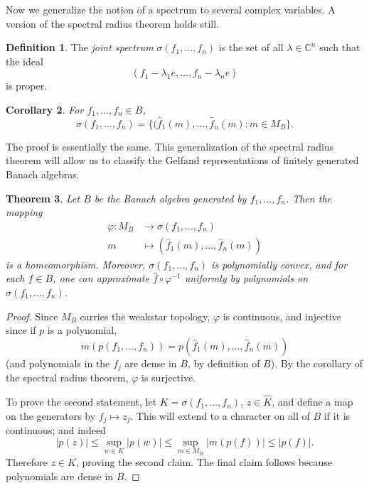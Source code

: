 \documentclass[12pt]{report}
\newcommand{\CC}{\mathbb{C}}
\newcommand{\dfn}[1]{\emph{#1}\index{#1}}
\newtheorem{theorem}{Theorem}[chapter]
\newtheorem{corollary}[theorem]{Corollary}
\theoremstyle{definition}
\newtheorem{definition}[theorem]{Definition}
\begin{document}
    Now we generalize the notion of a spectrum to several complex variables. A version of the spectral radius theorem holds still.
\begin{definition}
    The \dfn{joint spectrum} $\sigma(f_1, \dots, f_n)$ is the set of all $\lambda \in \CC^n$ such that the ideal
    $$(f_1 - \lambda_1 e, \dots, f_n -\lambda_n e)$$
    is proper.
\end{definition}
\begin{corollary}
    For $f_1, \dots, f_n \in B$,
    $$\sigma(f_1, \dots, f_n) = \{(\hat f_1(m), \dots, \hat f_n(m): m \in M_B\}.$$
\end{corollary}
    The proof is essentially the same. This generalization of the spectral radius theorem will allow us to classify the Gelfand representations of finitely generated Banach algebras.
\begin{theorem}
    Let $B$ be the Banach algebra generated by $f_1, \dots, f_n$. Then the mapping
\begin{align*}
    \varphi: M_B &\to \sigma(f_1, \dots, f_n)\\
    m &\mapsto (\hat f_1(m), \dots, \hat f_n(m))
\end{align*}
    is a homeomorphism. Moreover, $\sigma(f_1, \dots, f_n)$ is polynomially convex, and for each $f \in B$, one can approximate $\hat f \circ \varphi^{-1}$ uniformly by polynomials on $\sigma(f_1, \dots, f_n)$.
\end{theorem}
\begin{proof}
    Since $M_B$ carries the weakstar topology, $\varphi$ is continuous, and injective since if $p$ is a polynomial,
    $$m(p(f_1, \dots, f_n)) = p(\hat f_1(m), \dots, \hat f_n(m))$$
    (and polynomials in the $f_j$ are dense in $B$, by definition of $B$). By the corollary of the spectral radius theorem, $\varphi$ is surjective.
    
    To prove the second statement, let $K = \sigma(f_1, \dots, f_n)$, $z \in \hat K$, and define a map on the generators by $f_j \mapsto z_j$. This will extend to a character on all of $B$ if it is continuous; and indeed
    $$|p(z)| \leq \sup_{w \in K} |p(w)| \leq \sup_{m \in M_B} |m(p(f))| \leq |p(f)|.$$
    Therefore $z \in K$, proving the second claim. The final claim follows because polynomials are dense in $B$.
\end{proof}
    
\end{document}
